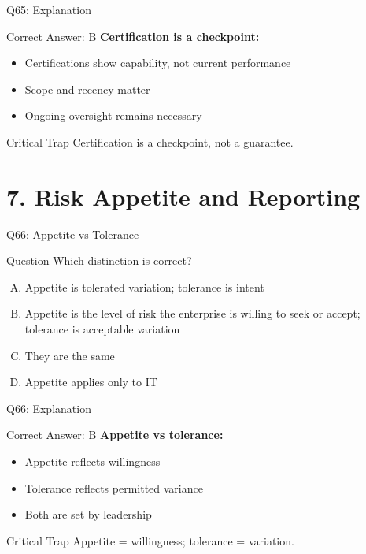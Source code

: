 \documentclass{beamer}
\begin{document}
	\begin{frame}{Q65: Explanation}
		\begin{block}{Correct Answer: B}
			\textbf{Certification is a checkpoint:}
			\begin{itemize}
				\item Certifications show capability, not current performance
				\item Scope and recency matter
				\item Ongoing oversight remains necessary
			\end{itemize}
		\end{block}
		\begin{alertblock}{Critical Trap}
			Certification is a checkpoint, not a guarantee.
		\end{alertblock}
	\end{frame}
	
	\section{7. Risk Appetite and Reporting}
	
	\begin{frame}{Q66: Appetite vs Tolerance}
		\begin{block}{Question}
			Which distinction is correct?
		\end{block}
		\begin{enumerate}[(A)]
			\item Appetite is tolerated variation; tolerance is intent
			\item Appetite is the level of risk the enterprise is willing to seek or accept; tolerance is acceptable variation
			\item They are the same
			\item Appetite applies only to IT
		\end{enumerate}
	\end{frame}
	
	\begin{frame}{Q66: Explanation}
		\begin{block}{Correct Answer: B}
			\textbf{Appetite vs tolerance:}
			\begin{itemize}
				\item Appetite reflects willingness
				\item Tolerance reflects permitted variance
				\item Both are set by leadership
			\end{itemize}
		\end{block}
		\begin{alertblock}{Critical Trap}
			Appetite = willingness; tolerance = variation.
		\end{alertblock}
	\end{frame}
	
\end{document}

